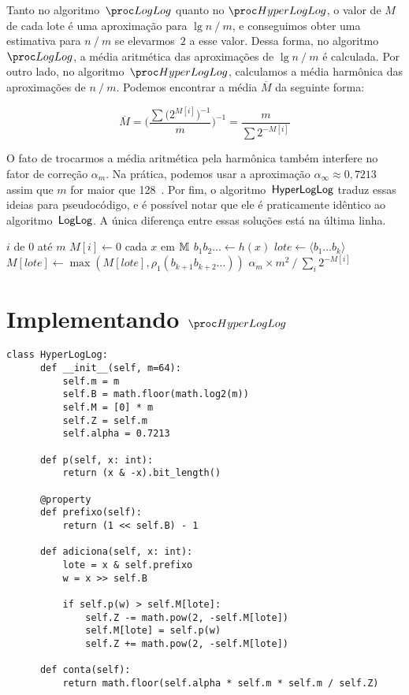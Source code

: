 Tanto no algoritmo~$\LOG$ quanto no $\HLOG$, o valor de $M$ de cada lote é uma aproximação para $\lg n \mathbin{/} m$, e 
conseguimos obter uma estimativa para $n \mathbin{/} m$ se elevarmos~$2$ a esse valor. Dessa forma, no algoritmo~$\LOG$, 
a média aritmética das aproximações de $\lg n \mathbin{/} m$ é calculada. Por outro lado, no algoritmo~$\HLOG$, 
calculamos a média harmônica das aproximações de $n \mathbin{/} m$. Podemos encontrar a média $\overline{M}$ da seguinte 
forma:

\[ \overline{M} = \bigg(\frac{\sum\big(2^{M[i]}\big)^{-1}}{m}\bigg)^{-1} = \frac{m}{\sum2^{-M[i]}} \]

O fato de trocarmos a média aritmética pela harmônica também interfere no fator de correção $\alpha_m$. Na prática, 
podemos usar a aproximação $\alpha_{\infty} \approx 0{,}7213$ assim que $m$ for maior que 128~\citep{HyperLogLogWiki}.
Por fim, o algoritmo~$\textsf{HyperLogLog}$ traduz essas ideias para pseudocódigo, e é possível notar que ele é praticamente 
idêntico ao algoritmo~$\textsf{LogLog}$. A única diferença entre essas soluções está na última linha.

\begin{codebox}
      \li \For $i$ de $0$ até $m$
            \Do
      \li   $M[i] \gets 0$
            \End
      \li \For cada $x$ em $\mathbb{M}$ 
            \Do
      \li   $b_1b_2{\dots} \gets h(x)$
      \li   $lote \gets \langle b_1 {\dots} b_k \rangle$
      \li   $M[lote] \gets \max(M[lote], \rho_1(b_{k+1}b_{k+2}{\dots}))$
            \End
      \li
      \Return $\alpha_m \times m^2 \mathbin{/} \sum_i{2^{-M[i]}}$   
      \End
\end{codebox}

\newpage
\section{Implementando $\HLOG$}

\begin{lstlisting}[style=mypython,caption=Implementação do algoritmo $\hlogprogram$,captionpos=b, label=hloglog:code]
class HyperLogLog:
      def __init__(self, m=64):
          self.m = m
          self.B = math.floor(math.log2(m))
          self.M = [0] * m
          self.Z = self.m
          self.alpha = 0.7213
  
      def p(self, x: int):
          return (x & -x).bit_length()
  
      @property
      def prefixo(self):
          return (1 << self.B) - 1
  
      def adiciona(self, x: int):
          lote = x & self.prefixo
          w = x >> self.B
  
          if self.p(w) > self.M[lote]:
              self.Z -= math.pow(2, -self.M[lote])
              self.M[lote] = self.p(w)
              self.Z += math.pow(2, -self.M[lote])
  
      def conta(self):
          return math.floor(self.alpha * self.m * self.m / self.Z)
\end{lstlisting}

